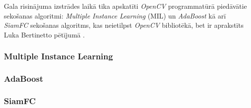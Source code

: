 Gala risinājuma izstrādes laikā tika apskatīti \textit{OpenCV} programmatūrā piedāvātie sekošanas algoritmi: \textit{Multiple Instance Learning} (MIL) un \textit{AdaBoost} kā arī \textit{SiamFC} sekošanas algoritms, kas neietilpst \textit{OpenCV} bibliotēkā, bet ir aprakstīts Luka Bertinetto pētījumā \cite{bertinetto2016fully}.

\subsubsection{Multiple Instance Learning}

\subsubsection{AdaBoost}
\subsubsection{SiamFC}